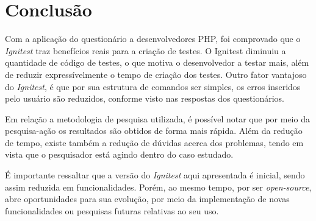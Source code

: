 \chapter{Conclusão}

  Com a aplicação do questionário a desenvolvedores PHP, foi comprovado que o \textit{Ignitest} traz benefícios reais para a criação de testes.
  O Ignitest diminuiu a quantidade de código de testes, o que motiva o desenvolvedor a testar mais, além de reduzir expressívelmente o tempo de criação dos testes.
  Outro fator vantajoso do \textit{Ignitest}, é que por sua estrutura de comandos ser simples, os erros inseridos pelo usuário são reduzidos, conforme visto nas respostas dos questionários.
  
  Em relação a metodologia de pesquisa utilizada, é possível notar que por meio da pesquisa-ação os resultados são obtidos de forma mais rápida. Além da redução de tempo, existe também a redução de dúvidas acerca dos problemas, tendo em vista que o pesquisador está agindo dentro do caso estudado.
  
  É importante ressaltar que a versão do \textit{Ignitest} aqui apresentada é inicial, sendo assim reduzida em funcionalidades. Porém, ao mesmo tempo, por ser \textit{open-source}, abre oportunidades para sua evolução, por meio da implementação de novas funcionalidades ou pesquisas futuras relativas ao seu uso.